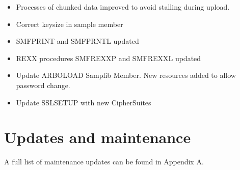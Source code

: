 \documentclass[letterpaper,10pt,english]{sphinxmanual}
\begin{document}
\begin{itemize}
\item {} 
Processes of chunked data improved to avoid stalling during upload.

\end{itemize}

\begin{itemize}
\item {} 
Correct keysize in sample member

\end{itemize}

\begin{itemize}
\item {} 
SMFPRINT and SMFPRNTL updated

\item {} 
REXX procedures SMFREXXP and SMFREXXL updated

\end{itemize}

\begin{itemize}
\item {} 
Update ARBOLOAD Samplib Member. New resources added to allow password change.

\end{itemize}

\begin{itemize}
\item {} 
Update SSLSETUP with new CipherSuites

\end{itemize}


\chapter{Updates and maintenance}
\label{\detokenize{TN202101:updates-and-maintenance}}
A full list of maintenance updates can be found in Appendix A.

\newpage
\end{document}
